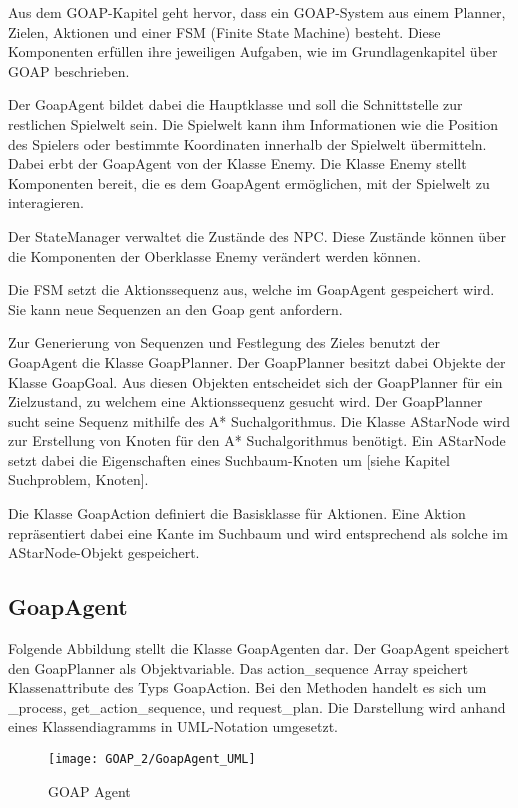 Aus dem GOAP-Kapitel geht hervor, dass ein GOAP-System aus einem Planner, Zielen, Aktionen und einer FSM (Finite State Machine) besteht. Diese Komponenten erfüllen ihre jeweiligen Aufgaben, wie im Grundlagenkapitel über GOAP beschrieben.

Der GoapAgent bildet dabei die Hauptklasse und soll die Schnittstelle zur restlichen Spielwelt sein. Die Spielwelt kann ihm Informationen wie die Position des Spielers oder bestimmte Koordinaten innerhalb der Spielwelt übermitteln. Dabei erbt der GoapAgent von der Klasse Enemy. Die Klasse Enemy stellt Komponenten bereit, die es dem GoapAgent ermöglichen, mit der Spielwelt zu interagieren.

Der StateManager verwaltet die Zustände des NPC. Diese Zustände können über die Komponenten der Oberklasse Enemy verändert werden können.

Die FSM setzt die Aktionssequenz aus, welche im GoapAgent gespeichert wird. Sie kann neue Sequenzen an den Goap gent anfordern.

Zur Generierung von Sequenzen und Festlegung des Zieles benutzt der GoapAgent die Klasse GoapPlanner. Der GoapPlanner besitzt dabei Objekte der Klasse GoapGoal. Aus diesen Objekten entscheidet sich der GoapPlanner für ein Zielzustand, zu welchem eine Aktionssequenz gesucht wird.
Der GoapPlanner sucht seine Sequenz mithilfe des A* Suchalgorithmus. Die Klasse AStarNode wird zur Erstellung von Knoten für den A* Suchalgorithmus benötigt. Ein AStarNode setzt dabei die Eigenschaften eines Suchbaum-Knoten um [siehe Kapitel Suchproblem, Knoten].

Die Klasse GoapAction definiert die Basisklasse für Aktionen. Eine Aktion repräsentiert dabei eine Kante im Suchbaum und wird entsprechend als solche im AStarNode-Objekt gespeichert.



\subsection{GoapAgent}

Folgende Abbildung stellt die Klasse GoapAgenten dar. Der GoapAgent speichert den GoapPlanner als Objektvariable. Das action\_sequence Array speichert Klassenattribute des Typs GoapAction. Bei den Methoden handelt es sich um \_process, get\_action\_sequence, und request\_plan. Die Darstellung wird anhand eines Klassendiagramms in UML-Notation umgesetzt.

\begin{figure}[h]
  \centering
  \texttt{[image: GOAP\_2/GoapAgent\_UML]}
	\captionsetup{justification=justified, format=plain}
  \caption{GOAP Agent}
  \label{GOAP Agent}
\end{figure}

